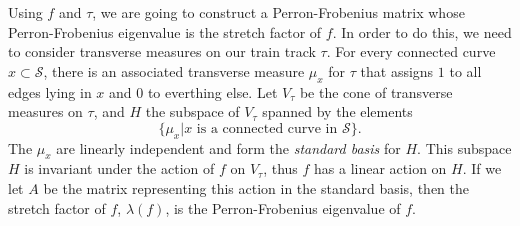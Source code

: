 Using $f$ and $\tau$, we are going to construct a Perron-Frobenius matrix whose Perron-Frobenius eigenvalue is the stretch factor of $f$. In order to do this, we need to consider transverse measures on our train track $\tau$. For every connected curve $x \subset \mathcal{S}$, there is an associated transverse measure $\mu_x$ for $\tau$ that assigns $1$ to all edges lying in $x$ and 0 to everthing else. Let $V_\tau$ be the cone of transverse measures on $\tau$, and $H$ the subspace of $V_\tau$ spanned by the elements $$\{\mu_x \vert x \text{ is a connected curve in } \mathcal{S}\}.$$ The $\mu_x$ are linearly independent and form the \textit{standard basis} for $H$. This subspace $H$ is invariant under the action of $f$ on $V_\tau$, thus $f$ has a linear action on $H$. If we let $A$ be the matrix representing this action in the standard basis, then the stretch factor of $f$, $\lambda(f)$, is the Perron-Frobenius eigenvalue of $f$.


